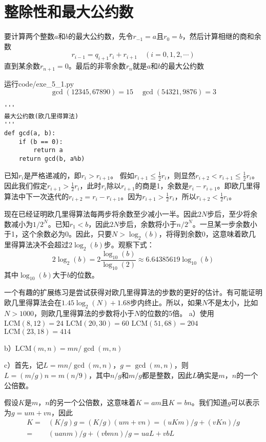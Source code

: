 \chapter{整除性和最大公约数}
\begin{theorem}[欧几里得算法]
要计算两个整数$a$和$b$的最大公约数，先令$r_{-1}=a$且$r_0=b$，然后计算相继的商和余数
\[r_{i-1}=q_{i+1}r_i+r_{i+1}\quad (i=0,1,2,\cdots)\]
直到某余数$r_{n+1}=0$。最后的非零余数$r_n$就是$a$和$b$的最大公约数
\end{theorem}
%
\exercise 运行code/exe\_5\_1.py
\[\gcd(12345, 67890)= 15\quad
\gcd(54321, 9876)= 3\]
%
\exercise 
\begin{lstlisting}
'''
最大公约数(欧几里得算法)
'''
def gcd(a, b):
    if (b == 0):
        return a
    return gcd(b, a%b)
\end{lstlisting}
%
\exercise 已知$r_i$是严格递减的，即$r_i > r_{i+1}$。
假如$r_{i+1} \le \frac{1}{2}r_i$，则显然$r_{i+2} < r_{i+1}\le \frac{1}{2}r_i$。
因此我们假定$r_{i+1}> \frac{1}{2}r_i$，此时$r_i$除以$r_{i+1}$的商是1，余数是$r_i - r_{i+1}$。即欧几里得算法中下一次迭代的$r_{i+2}=r_i - r_{i+1}$。因为$r_{i+1}> \frac{1}{2}r_i$，所以$r_{i+2} < \frac{1}{2}r_i$。\par
现在已经证明欧几里得算法每两步将余数至少减小一半。因此$2N$步后，至少将余数减小为$1/2^N$。已知$r_1 < b$，因此$2N$步后，余数将小于$n/2^N$。一旦某一步余数小于1，这个余数必为0。因此，只要$N>\log_2(b)$，将得到余数0，这意味着欧几里得算法决不会超过$2\log_2(b)$步。观察下式：
\[2\log_2(b)=2\frac{\log_{10}(b)}{\log_{10}(2)}\approx 6.64385619\log_{10}(b)\]
其中$\log_{10}(b)$大于$b$的位数。\par
一个有趣的扩展练习是尝试获得对欧几里得算法的步数的更好的估计。有可能证明欧几里得算法会在$1.45\log_2(N)+1.68$步内终止。所以，如果$N$不是太小，比如$N>1000$，则欧几里得算法的步数将小于$N$的位数的5倍。
%
\exercise a）使用
$\mathrm{LCM}(8, 12) = 24$\quad
$\mathrm{LCM}(20, 30) = 60$\quad
$\mathrm{LCM}(51, 68) = 204$\quad
$\mathrm{LCM}(23, 18) = 414$\par
b）$\mathrm{LCM}(m, n) = mn / \gcd(m, n)$\par
c）\proof 首先，记$L = m n / \gcd(m, n)$，$g=\gcd(m,n)$，则$L=(m/g)n = m(n/9)$，其中$n/g$和$m/g$都是整数，因此$L$确实是$m$，$n$的一个公倍数。\par
假设$K$是$m$，$n$的另一个公倍数，这意味着$K=am$且$K=bn$。我们知道$g$可以表示为$g=um+vn$，因此
\begin{align*}
    K=&(K/g)g=(K/g)(um+vn)=(uKm)/g+(vKn)/g \\
    =&(uanm)/g+(vbmn)/g=uaL+vbL
\end{align*}

